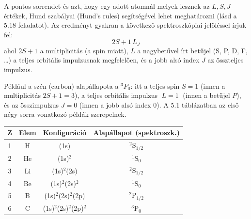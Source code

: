 \documentclass[../main.tex]{subfiles}
\begin{document}
A pontos sorrendet és azt, hogy egy adott atomnál melyek lesznek az $L,S,J$ értékek, Hund szabályai (Hund's rules) segítségével lehet meghatározni (lásd a 5.18 feladatot). Az eredményt gyakran a következő spektroszkópiai jelöléssel írjuk fel:
\[
2S+1\,L_J
\tag{5.45}
\]
ahol $2S+1$ a multiplicitás (a spin miatt), $L$ a nagybetűvel írt betűjel (S, P, D, F, \dots) a teljes orbitális impulzusnak megfelelően, és a jobb alsó index $J$ az összteljes impulzus.

Például a szén (carbon) alapállapota a $^3P_0$: itt a teljes spin $S=1$ (innen a multiplicitás $2S+1=3$), a teljes orbitális impulzus $\;L=1\;$ (innen a betűjel $P$), és az összimpulzus $J=0$ (innen a jobb alsó index 0). A 5.1 táblázatban az első négy sorra vonatkozó példák szerepelnek.

\bigskip

\begin{center}
\begin{tabular}{@{}cccc@{}}
\hline
Z & Elem & Konfiguráció & Alapállapot (spektroszk.)\\
\hline
1 & H   & (1s)                     & $^2\mathrm{S}_{1/2}$ \\
2 & He  & (1s)$^2$                 & $^1\mathrm{S}_{0}$   \\
\hline
3 & Li  & (1s)$^2$(2s)             & $^2\mathrm{S}_{1/2}$ \\
4 & Be  & (1s)$^2$(2s)$^2$         & $^1\mathrm{S}_{0}$   \\
\hline
5 & B   & (1s)$^2$(2s)$^2$(2p)     & $^2\mathrm{P}_{1/2}$ \\
6 & C   & (1s)$^2$(2s)$^2$(2p)$^2$ & $^3\mathrm{P}_{0}$   \\
\hline
\end{tabular}
\end{center}
\end{document}
